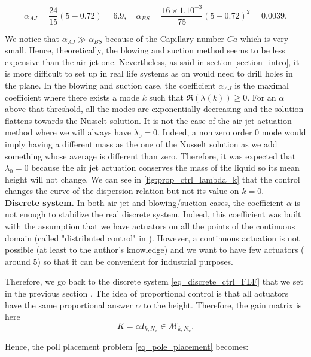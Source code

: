 \documentclass[12pt]{article}
\begin{document}
\begin{equation}    
\alpha_{AJ} = \frac{24}{15}(5-0.72) = 6.9, \quad \alpha_{BS} = \frac{16\times 1.10^{-3}}{75}(5-0.72)^2= 0.0039.
\end{equation}

We notice that $\alpha_{AJ} \gg \alpha_{BS}$ because of the Capillary number $Ca$ which is very small. Hence, theoretically, the blowing and suction method seems to be less expensive than the air jet one. Nevertheless, as said in section \ref{section_intro}, it is more difficult to set up in real life systems as on would need to drill holes in the plane. In the blowing and suction case,  the coefficient $\alpha_{AJ}$ is the maximal coefficient where there exists a mode $k$ such
that $\mathfrak{R}(\lambda(k)) \geq 0.$ For an $\alpha$ above that threshold, all the modes are exponentially decreasing and the 
solution flattens towards the Nusselt solution. It is not the case of the air jet actuation method where we will always have 
$\lambda_0=0.$ Indeed, a non zero order 0 mode would imply having a different mass as the one of the Nusselt solution as we add 
something whose average is different than zero. Therefore, it was expected that $\lambda_0 = 0$ because the air jet actuation 
conserves the mass of the liquid so its mean height will not change. We can see in \eqref{fig:prop_ctrl_lambda_k} that the control changes the curve of the dispersion relation but not its value on $k=0$.
\\

\underline{\textbf{Discrete system.}} In both air jet and blowing/suction cases, the coefficient $\alpha$ is not enough to stabilize the real 
discrete system. Indeed, this coefficient was built with the assumption that we have actuators on all the points of the continuous 
domain (called "distributed control" in \cite{Thompson_2016_prop_ctrl}). However, a continuous actuation is not
 possible (at least to the author's knowledge) and we want to have few actuators ( around 5) so that it can be convenient for industrial
 purposes. 

Therefore, we go back to the discrete system \eqref{eq_discrete_ctrl_FLF} that we set in the previous section . The idea of proportional control is that all actuators have the same proportional answer $\alpha$ to the height. Therefore, the gain matrix is here 
\begin{equation}
    K = \alpha I_{k, N_x} \in \mathcal{M}_{k,N_x}.
\end{equation}

Hence, the poll placement problem \eqref{eq_pole_placement} becomes: 
\end{document}
